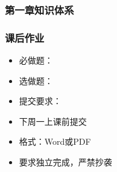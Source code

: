 \documentclass[aspectratio=43]{beamer}
\begin{document}
\begin{frame}
  \frametitle{第一章知识体系}

\end{frame}

\begin{frame}
  \frametitle{课后作业}

  \begin{itemize}
  \item<+-> 必做题：
  \item<+-> 选做题：
  \item<+-> 提交要求：
  \item<+-> 下周一上课前提交
  \item<+-> 格式：Word或PDF
  \item<+-> 要求独立完成，严禁抄袭
  \end{itemize}
\end{frame}
\end{document}
